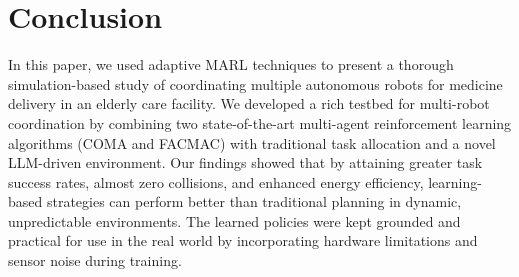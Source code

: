 \documentclass[conference]{IEEEtran}
\begin{document}
\section{Conclusion}
\label{sec:conclusion}
In this paper, we used adaptive MARL techniques to present a thorough simulation-based study of coordinating multiple autonomous robots for medicine delivery in an elderly care facility. We developed a rich testbed for multi-robot coordination by combining two state-of-the-art multi-agent reinforcement learning algorithms (COMA and FACMAC) with traditional task allocation and a novel LLM-driven environment. Our findings showed that by attaining greater task success rates, almost zero collisions, and enhanced energy efficiency, learning-based strategies can perform better than traditional planning in dynamic, unpredictable environments. The learned policies were kept grounded and practical for use in the real world by incorporating hardware limitations and sensor noise during training.
\end{document}
